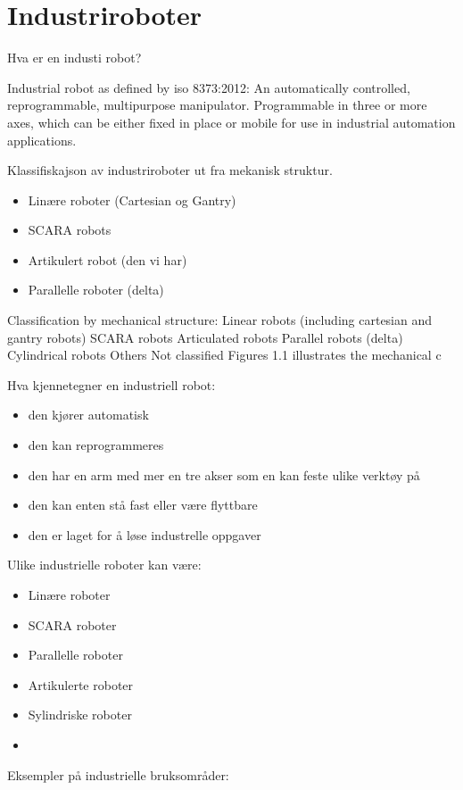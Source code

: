 \documentclass[10pt,a5paper]{article}
\begin{document}
\section{Industriroboter}
Hva er en industi robot?

\vskip 5pt 
Industrial robot as defined by iso 8373:2012:
An automatically controlled, reprogrammable, multipurpose manipulator.
Programmable in three or more axes, which can be either fixed in place or mobile for use in industrial automation applications.

\vskip 5pt 
Klassifiskajson av industriroboter ut fra mekanisk struktur. 
\begin{itemize}[noitemsep]
	\item Linære roboter (Cartesian og Gantry)
	\item SCARA robots
	\item Artikulert robot (den vi har)
	\item Parallelle roboter (delta)
\end{itemize}


Classification by mechanical structure:
Linear robots (including cartesian and gantry robots)
SCARA robots
Articulated robots
Parallel robots (delta)
Cylindrical robots
Others
Not classified
Figures 1.1 illustrates the mechanical c

\vskip 10pt 
Hva kjennetegner en industriell robot:
\begin{itemize}[noitemsep]
\item den kjører automatisk
\item den kan reprogrammeres
\item den har en arm med mer en tre akser som en kan feste ulike verktøy på
\item den kan enten stå fast eller være flyttbare
\item den er laget for å løse industrelle oppgaver 
\end{itemize}

Ulike industrielle roboter kan være:
\begin{itemize}[noitemsep]
\item Linære roboter
\item SCARA roboter
\item Parallelle roboter
\item Artikulerte roboter
\item Sylindriske roboter
\item 
\end{itemize}

\vskip 10pt 
Eksempler på industrielle bruksområder:
\end{document}
